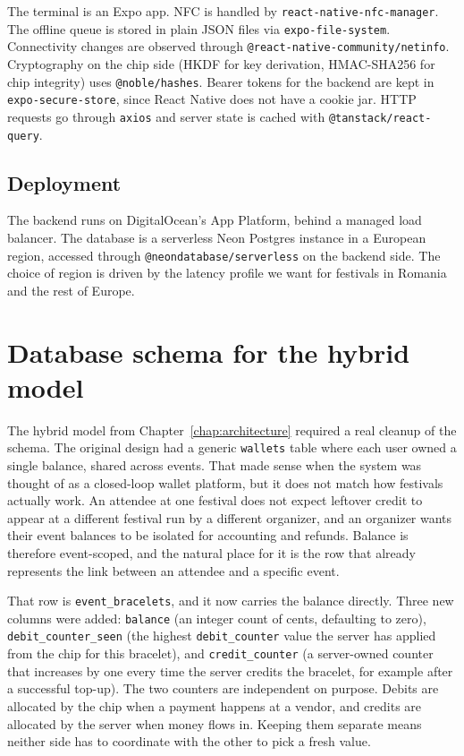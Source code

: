 The terminal is an Expo app. NFC is handled by \texttt{react-native-nfc-manager}. The offline queue is stored in plain JSON files via \texttt{expo-file-system}. Connectivity changes are observed through \texttt{@react-native-community/netinfo}. Cryptography on the chip side (HKDF for key derivation, HMAC-SHA256 for chip integrity) uses \texttt{@noble/hashes}. Bearer tokens for the backend are kept in \texttt{expo-secure-store}, since React Native does not have a cookie jar. HTTP requests go through \texttt{axios} and server state is cached with \texttt{@tanstack/react-query}.

\subsection{Deployment}
\label{subsec:impl-deployment}

The backend runs on DigitalOcean's App Platform, behind a managed load balancer. The database is a serverless Neon Postgres instance in a European region, accessed through \texttt{@neondatabase/serverless} on the backend side. The choice of region is driven by the latency profile we want for festivals in Romania and the rest of Europe.

\section{Database schema for the hybrid model}
\label{sec:impl-schema}

The hybrid model from Chapter~\ref{chap:architecture} required a real cleanup of the schema. The original design had a generic \texttt{wallets} table where each user owned a single balance, shared across events. That made sense when the system was thought of as a closed-loop wallet platform, but it does not match how festivals actually work. An attendee at one festival does not expect leftover credit to appear at a different festival run by a different organizer, and an organizer wants their event balances to be isolated for accounting and refunds. Balance is therefore event-scoped, and the natural place for it is the row that already represents the link between an attendee and a specific event.

That row is \texttt{event\_bracelets}, and it now carries the balance directly. Three new columns were added: \texttt{balance} (an integer count of cents, defaulting to zero), \texttt{debit\_counter\_seen} (the highest \texttt{debit\_counter} value the server has applied from the chip for this bracelet), and \texttt{credit\_counter} (a server-owned counter that increases by one every time the server credits the bracelet, for example after a successful top-up). The two counters are independent on purpose. Debits are allocated by the chip when a payment happens at a vendor, and credits are allocated by the server when money flows in. Keeping them separate means neither side has to coordinate with the other to pick a fresh value.


